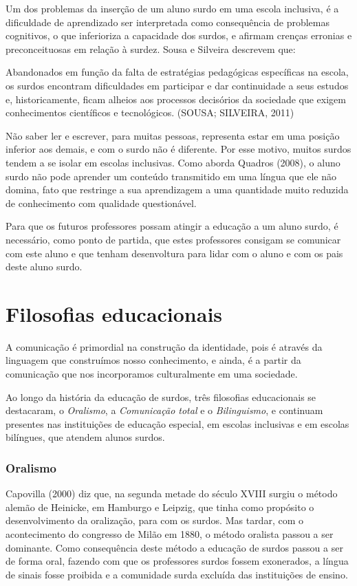 \documentclass[brasil]{abnt}
\begin{document}
	Um dos problemas da inserção de um aluno surdo em uma escola inclusiva, é a dificuldade de aprendizado ser interpretada como consequência de problemas cognitivos, o que inferioriza
	a capacidade dos surdos, e afirmam crenças erronias e preconceituosas em relação à surdez. Sousa e Silveira descrevem que:
	
		\begin{citacao} Abandonados em função da falta de estratégias pedagógicas específicas na escola, os surdos encontram dificuldades em participar e dar continuidade a
						seus estudos e, historicamente, ficam alheios aos processos decisórios da sociedade que exigem conhecimentos científicos e tecnológicos. (SOUSA; SILVEIRA, 2011)
		\end{citacao}
		
	Não saber ler e escrever, para muitas pessoas, representa estar em uma posição inferior aos demais, e com o surdo não é diferente. Por esse motivo, muitos surdos tendem a se isolar em
	escolas inclusivas. Como aborda Quadros (2008), o aluno surdo não pode aprender um conteúdo transmitido em uma língua que ele não domina, fato que restringe a sua aprendizagem a uma 
	quantidade muito reduzida de conhecimento com qualidade questionável. 
	
	Para que os futuros professores possam atingir a educação a um aluno surdo, é necessário, como ponto de partida, que estes professores consigam se comunicar com este aluno e que tenham desenvoltura 
	para lidar com o aluno e com os pais deste aluno surdo.

\chapter{Filosofias educacionais}
		A comunicação é primordial na construção da identidade, pois é através da linguagem que construímos nosso conhecimento, e ainda, é a partir da comunicação que nos incorporamos culturalmente em uma 
		sociedade. 
		
		Ao longo da história da educação de surdos, três filosofias educacionais se destacaram, o \textit{Oralismo}, a \textit{Comunicação total} e o \textit{Bilinguismo}, e continuam presentes 
		nas instituições de educação especial, em escolas inclusivas e em escolas bilíngues, que atendem alunos surdos.
		
		\subsection{Oralismo}
		 Capovilla (2000) diz que, na segunda metade do século XVIII surgiu o método alemão de Heinicke, em Hamburgo e Leipzig, que tinha como propósito o desenvolvimento da oralização, para com os surdos. 
		 Mas tardar, com o acontecimento do congresso de Milão em 1880, o método oralista passou a ser dominante. Como consequência deste método a educação de surdos passou a ser de forma oral, fazendo 
		 com que os professores surdos fossem exonerados, a língua de sinais fosse proibida e a comunidade surda excluída das instituições de ensino. 
		 
\end{document}
